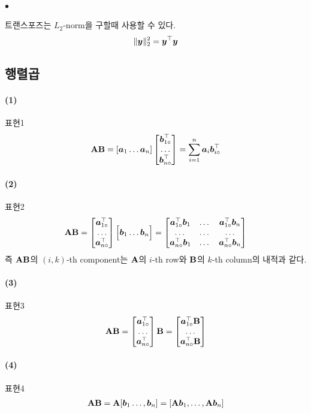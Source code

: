 \documentclass[12pt,oneside,english,a4paper]{article}
\def\ck{\paragraph{\Large$\bullet$}\Large}
\def\one{\paragraph{\Large(1)}\Large}
\def\two{\paragraph{\Large(2)}\Large}
\def\three{\paragraph{\Large(3)}\Large}
\def\four{\paragraph{\Large(4)}\Large}
\newcommand{\bsa}{\mbox{\boldmath $a$}}
\newcommand{\bsb}{\mbox{\boldmath $b$}}
\newcommand{\bsy}{\mbox{\boldmath $y$}}
\newcommand{\bfA}{\mbox{$\bf{A}$}}
\newcommand{\bfB}{\mbox{$\bf{B}$}}
\begin{document}
\ck 트랜스포즈는 $L_2$-norm을 구할때 사용할 수 있다.
\begin{align*}
\| {\bsy} \|_ 2^2={\bsy}^\top{\bsy}
\end{align*}


\subsection{행렬곱}

\one 표현1 
\[
	\bfA \bfB 
	= [\bsa_1 \dots \bsa_n ] 
	\begin{bmatrix}
		\bsb_{1\circ}^\top \\ \dots \\ \bsb_{n\circ}^\top 
	\end{bmatrix}
	=\sum_{i=1}^n\bsa_i\bsb_{i\circ}^\top
\]

\two 표현2
\begin{align*}
	\bfA \bfB =\begin{bmatrix}\bsa_{1\circ}^\top \\ \dots \\ \bsa_{n\circ}^\top \end{bmatrix}\Big[\bsb_1\dots \bsb_n\Big] = \begin{bmatrix}
		\bsa_{1\circ}^\top \bsb_1 & \dots & \bsa_{1\circ}^\top \bsb_n \\ \dots &\dots & \dots \\  \bsa_{n\circ}^\top \bsb_1 & \dots & \bsa_{n\circ}^\top \bsb_n\end{bmatrix}
\end{align*}
즉 ${\bf A}{\bf B}$의 $(i,k)$-th component는 ${\bf A}$의 $i$-th row와 ${\bf B}$의 $k$-th column의 내적과 같다.   

\three 표현3 
\begin{align*}
	{\bfA}{\bfB}=\begin{bmatrix}
		\bsa_{1\circ}^\top \\ 
		\dots \\ 
		\bsa_{n\circ}^\top
	\end{bmatrix}{\bfB}=\begin{bmatrix}
	\bsa_{1\circ}^\top \bfB \\ 
	\dots \\ 
	\bsa_{n\circ}^\top\bfB
\end{bmatrix}
\end{align*}

\four 표현4 
\begin{align*}
	{\bfA}{\bfB}={\bfA} [\bsb_1 \dots,\bsb_n] = [\bfA\bsb_1,\dots,\bfA \bsb_n]
\end{align*}
\end{document}
